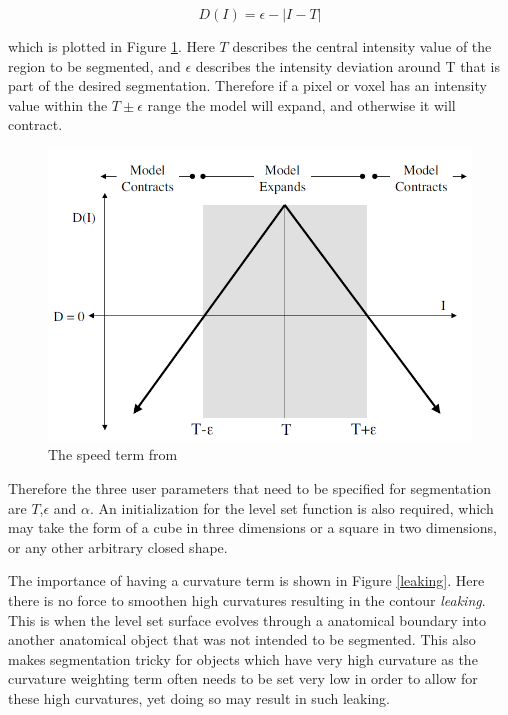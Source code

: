	\begin{equation}
	D(I)= \epsilon - |I-T|
	\label{eq:dataterm}
	\end{equation}

which is plotted in Figure \ref{fig:speedterm}. Here $T$ describes the central intensity value of the region to be segmented, and $\epsilon$ describes the intensity deviation around T that is part of the desired segmentation. Therefore if a pixel or voxel has an intensity value within the $T\pm\epsilon$ range the model will expand, and otherwise it will contract. 

	\begin{figure}[h]
		\centering
			\includegraphics[scale=0.3]{images/speedterm.png}
		\caption{The speed term from \cite{gist}}
		\label{fig:speedterm}
	\end{figure}

Therefore the three user parameters that need to be specified for segmentation are $T$,$\epsilon$ and $\alpha$. An initialization for the level set function is also required, which may take the form of a cube in three dimensions or a square in two dimensions, or any other arbitrary closed shape. 

The importance of having a curvature term is shown in Figure \ref{leaking}. Here there is no force to smoothen high curvatures resulting in the contour \textit{leaking}. This is when the level set surface evolves through a anatomical boundary into another anatomical object that was not intended to be segmented. This also makes segmentation tricky for objects which have very high curvature as the curvature weighting term often needs to be set very low in order to allow for these high curvatures, yet doing so may result in such leaking.

